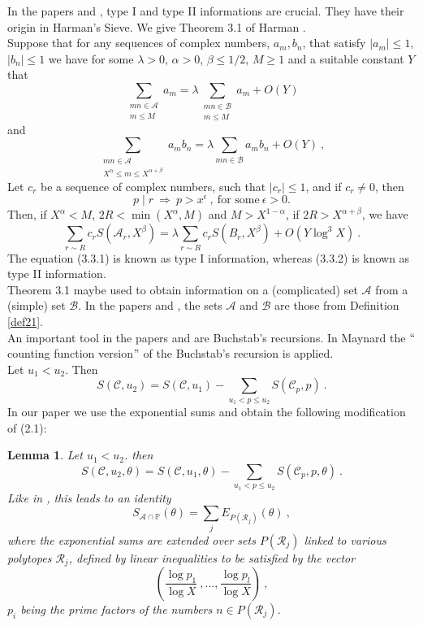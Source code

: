 \documentclass{amsart}
\newtheorem{lemma}[theorem]{Lemma}
\numberwithin{equation}{subsection}
\begin{document}
In the papers \cite{maynard} and \cite{maier-rassias-gold}, type I and type II informations are crucial. They have their origin in Harman's Sieve. We give Theorem 3.1  of Harman \cite{harman}.\\
Suppose that for any sequences of complex numbers, $a_m, b_n$, that satisfy $|a_m|\leq 1$, $|b_n|\leq 1$ we have for some $\lambda>0$, $\alpha>0$, $\beta\leq 1/2$, $M\geq 1$ and a suitable constant $Y$ that 
\[
\sum_{\substack{mn\in\mathcal{A}\\ m\leq M}} a_m=\lambda \sum_{\substack{mn\in\mathcal{B}\\ m\leq M}}a_m+O(Y) \tag{3.3.1}
\]
and
\[
\sum_{\substack{mn\in\mathcal{A}\\ X^{\alpha}\leq m\leq X^{\alpha+\beta}}} a_mb_n=\lambda \sum_{mn\in\mathcal{B}}a_mb_n+O(Y)\:, \tag{3.3.2}
\]
Let $c_r$ be a sequence of complex numbers, such that $|c_r|\leq 1$, and if $c_r\neq 0$, then 
\[
p\mid r\ \Rightarrow\ p>x^{\epsilon}\:,\ \text{for some}\ \epsilon>0.  \tag{3.3.3}
\]
Then, if $X^{\alpha}<M$, $2R<\min(X^\alpha, M)$ and $M>X^{1-\alpha}$, if $2R>X^{\alpha+\beta}$, we have
\[
\sum_{r\sim R}c_rS(\mathcal{A}_r, X^\beta)=\lambda\sum_{r\sim R} c_r S(B_r, X^\beta)+O(Y\log^3X)\:. \tag{3.3.4}
\]
The equation (3.3.1) is known as type I information, whereas  (3.3.2) is known as type II information.\\
Theorem 3.1 maybe used to obtain information on a (complicated) set $\mathcal{A}$ from a (simple) set $\mathcal{B}$. In the papers \cite{maynard} and  \cite{maier-rassias-gold}, the sets $\mathcal{A}$ and $\mathcal{B}$ are those from Definition \ref{def21}.\\An important tool in the papers \cite{maynard} and \cite{maier-rassias-gold} are Buchstab's recursions. In Maynard \cite{maynard} the $``$counting function version$"$ of the Buchstab's recursion is applied.\\
Let $u_1< u_2$. Then 
\[
S(\mathcal{C}, u_2)=S(\mathcal{C}, u_1)-\sum_{u_1<p\leq u_2}S(\mathcal{C}_p, p)\:. \tag{2.1}
\]
In our paper we use the exponential sums and obtain the following modification of (2.1):
\begin{lemma}\label{lem23}
Let $u_1<u_2$. then 
\[
S(\mathcal{C}, u_2, \theta)=S(\mathcal{C}, u_1, \theta)-\sum_{u_1<p\leq u_2}S(\mathcal{C}_p, p, \theta)\:. \tag{2.2}
\]
Like in \cite{maier-rassias-gold}, this leads to an identity
$$S_{\mathcal{A}\cap\mathbb{P}}(\theta)=\sum_{j} E_{P(\mathcal{R}_j)}(\theta)\:,$$
where the exponential sums are extended over sets $P(\mathcal{R}_j)$ linked to various polytopes $\mathcal{R}_j$, defined by linear inequalities to be satisfied by the vector
$$\left(\frac{\log p_1}{\log X}\:,\ldots, \frac{\log p_l}{\log X}  \right)\:,$$
$p_i$ being the prime factors of the numbers $n\in P(\mathcal{R}_j)$.
\end{lemma}
\end{document}
